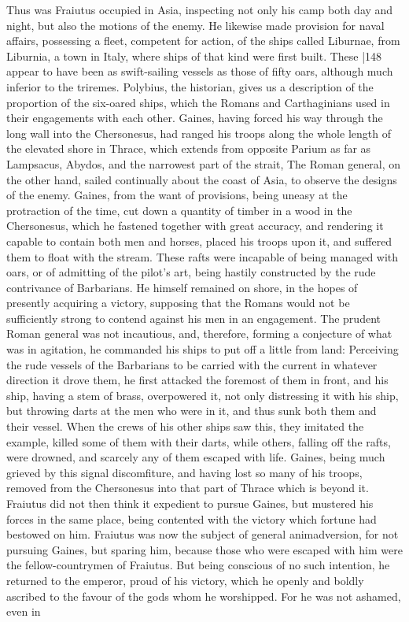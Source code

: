 Thus was Fraiutus occupied in Asia, inspecting not only his camp both day and night, but also the motions of the enemy. He likewise made provision for naval affairs, possessing a fleet, competent for action, of the ships called Liburnae, from Liburnia, a town in Italy, where ships of that kind were first built. These
|148 appear to have been as swift-sailing vessels as those of fifty oars, although much inferior to the triremes. Polybius, the historian, gives us a description of the proportion of the six-oared ships, which the Romans and Carthaginians used in their engagements with each other. Gaines, having forced his way through the long wall into the Chersonesus, had ranged his troops along the whole length of the elevated shore in Thrace, which extends from opposite Parium as far as Lampsacus, Abydos, and the narrowest part of the strait, The Roman general, on the other hand, sailed continually about the coast of Asia, to observe the designs of the enemy. Gaines, from the want of provisions, being uneasy at the protraction of the time, cut down a quantity of timber in a wood in the Chersonesus, which he fastened together with great accuracy, and rendering it capable to contain both men and horses, placed his troops upon it, and suffered them to float with the stream. These rafts were incapable of being managed with oars, or of admitting of the pilot's art, being hastily constructed by the rude contrivance of Barbarians. He himself remained on shore, in the hopes of presently acquiring a victory, supposing that the Romans would not be sufficiently strong to contend against his men in an engagement. The prudent Roman general was not incautious, and, therefore, forming a conjecture of what was in agitation, he commanded his ships to put off a little from land: Perceiving the rude vessels of the Barbarians to be carried with the current in whatever direction it drove them, he first attacked the foremost of them in front, and his ship, having a stem of brass, overpowered it, not only distressing it with his ship, but throwing darts at the men who were in it, and thus sunk both them and their vessel. When the crews of his other ships saw this, they imitated the example, killed some of them with their darts, while others, falling off the rafts, were drowned, and scarcely any of them escaped with life. Gaines, being much grieved by this signal discomfiture, and having lost so many of his troops, removed from the Chersonesus into that part of Thrace which is beyond it. Fraiutus did not then think it expedient to pursue Gaines, but mustered his forces in the same place, being contented with the victory which fortune had bestowed on him. Fraiutus was now the subject of general animadversion, for not pursuing Gaines, but sparing him, because those who were escaped with him were the fellow-countrymen of Fraiutus. But being conscious of no such intention, he returned to the emperor, proud of his victory, which he openly and boldly ascribed to the favour of the gods whom he worshipped. For he was not ashamed, even in
